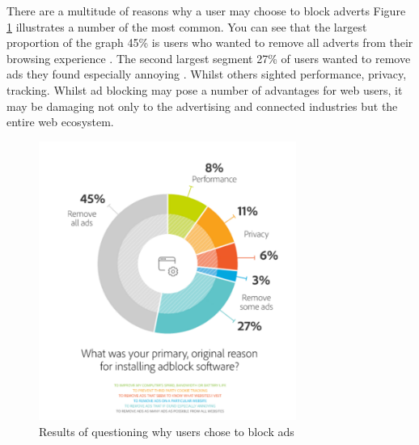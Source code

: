 \documentclass{article}
\begin{document}
There are a multitude of reasons why a user may choose to block adverts Figure \ref{fig:whyBlockAds} illustrates a number of the most common. You can see that the largest proportion of the graph 45\% is users who wanted to remove all adverts from their browsing experience \parencite{publishersWeb}. The second largest segment 27\% of users wanted to remove ads they found especially annoying \parencite{publishersWeb}. Whilst others sighted performance, privacy, tracking. Whilst ad blocking may pose a number of advantages for web users, it may be damaging not only to the advertising and connected industries but the entire web ecosystem. \\

\begin{figure}[H]
    \centering
    \includegraphics[width=0.75\textwidth]{whyBlockAds}
    \caption{Results of questioning why users chose to block ads \parencite{publishersWeb}}
    \label{fig:whyBlockAds}
\end{figure}
\end{document}
